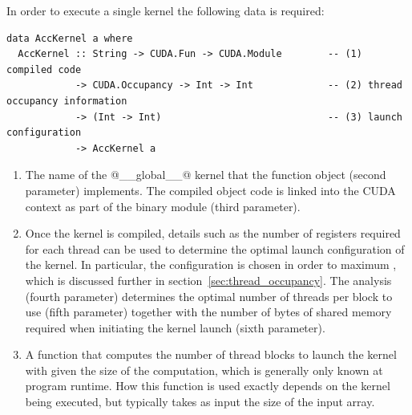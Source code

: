 In order to execute a single kernel the following data is required:
%
\begin{lstlisting}[style=haskell]
data AccKernel a where
  AccKernel :: String -> CUDA.Fun -> CUDA.Module        -- (1) compiled code
            -> CUDA.Occupancy -> Int -> Int             -- (2) thread occupancy information
            -> (Int -> Int)                             -- (3) launch configuration
            -> AccKernel a
\end{lstlisting}
%
\begin{enumerate}
\item The name of the @__global__@ kernel that the function object (second
    parameter) implements. The compiled object code is linked into the CUDA
    context as part of the binary module (third parameter).

\item Once the kernel is compiled, details such as the number of registers
    required for each thread can be used to determine the optimal launch
    configuration of the kernel. In particular, the configuration is chosen in
    order to maximum , which is discussed further in
    section~\ref{sec:thread_occupancy}.
    The analysis (fourth parameter) determines the optimal number of threads per
    block to use (fifth parameter) together with the number of bytes of shared
    memory required when initiating the kernel launch (sixth parameter).

\item A function that computes the number of thread blocks to launch the kernel
    with given the size of the computation, which is generally only known at
    program runtime. How this function is used exactly depends on the kernel
    being executed, but typically takes as input the size of the input array.
\end{enumerate}

